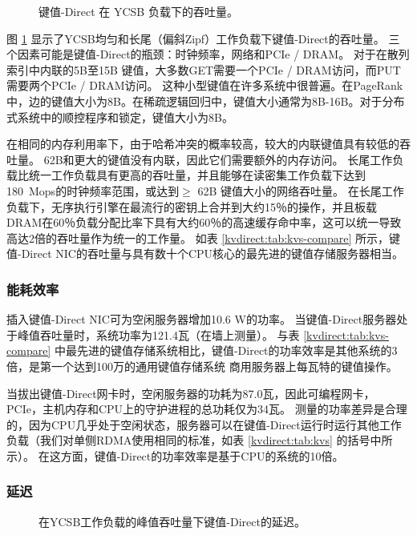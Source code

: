 \begin{figure}[t]
\centering
{}
\caption{键值-Direct 在 YCSB 负载下的吞吐量。}
\label{kvdirect:fig:ycsb-tput}

\end{figure}

图 \ref {kvdirect:fig:ycsb-tput} 显示了YCSB均匀和长尾（偏斜Zipf）工作负载下键值-Direct的吞吐量。
三个因素可能是键值-Direct的瓶颈：时钟频率，网络和PCIe / DRAM。
对于在散列索引中内联的5B至15B 键值，大多数GET需要一个PCIe / DRAM访问，而PUT需要两个PCIe / DRAM访问。
这种小型键值在许多系统中很普遍。在PageRank中，边的键值大小为8B。在稀疏逻辑回归中，键值大小通常为8B-16B。对于分布式系统中的顺控程序和锁定，键值大小为8B。

在相同的内存利用率下，由于哈希冲突的概率较高，较大的内联键值具有较低的吞吐量。
62B和更大的键值没有内联，因此它们需要额外的内存访问。
长尾工作负载比统一工作负载具有更高的吞吐量，并且能够在读密集工作负载下达到180~Mops的时钟频率范围，或达到$ \geq $ 62B 键值大小的网络吞吐量。
在长尾工作负载下，无序执行引擎在最流行的密钥上合并到大约15％的操作，并且板载DRAM在60％负载分配比率下具有大约60％的高速缓存命中率，这可以统一导致高达2倍的吞吐量作为统一的工作量。
如表 \ref {kvdirect:tab:kvs-compare} 所示，键值-Direct NIC的吞吐量与具有数十个CPU核心的最先进的键值存储服务器相当。

\subsubsection{能耗效率}

插入键值-Direct NIC可为空闲服务器增加10.6 W的功率。
当键值-Direct服务器处于峰值吞吐量时，系统功率为121.4瓦（在墙上测量）。
与表 \ref {kvdirect:tab:kvs-compare} 中最先进的键值存储系统相比，键值-Direct的功率效率是其他系统的3倍，是第一个达到100万的通用键值存储系统 商用服务器上每瓦特的键值操作。

当拔出键值-Direct网卡时，空闲服务器的功耗为87.0瓦，因此可编程网卡，PCIe，主机内存和CPU上的守护进程的总功耗仅为34瓦。
测量的功率差异是合理的，因为CPU几乎处于空闲状态，服务器可以在键值-Direct运行时运行其他工作负载（我们对单侧RDMA使用相同的标准，如表 \ref {kvdirect:tab:kvs} 的括号中所示）。
在这方面，键值-Direct的功率效率是基于CPU的系统的10倍。

\subsubsection{延迟}
\begin{figure}[t]
\centering
{}
\caption{在YCSB工作负载的峰值吞吐量下键值-Direct的延迟。}
\label{kvdirect:fig:ycsb-lat}

\end{figure}

